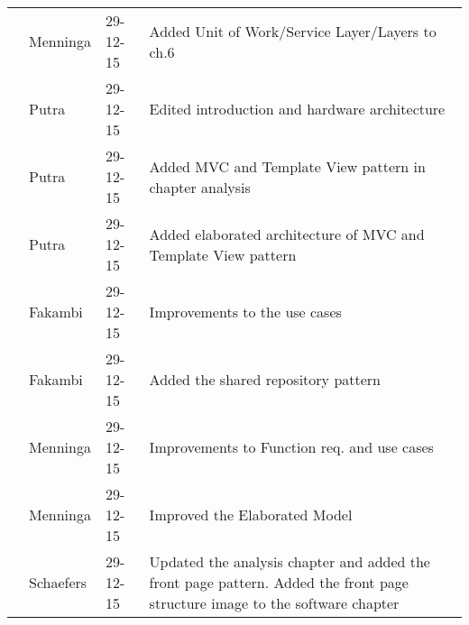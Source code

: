 \begin{longtable}{L{} L{} L{} L{}}
					& Menninga  & 29-12-15 & Added Unit of Work/Service Layer/Layers to ch.6 \\
					& Putra		& 29-12-15 & Edited introduction and hardware architecture \\
					& Putra		& 29-12-15 & Added MVC and Template View pattern in chapter analysis\\
					& Putra		& 29-12-15 & Added elaborated architecture of MVC and Template View pattern\\
					& Fakambi   & 29-12-15 & Improvements to the use cases \\
					& Fakambi   & 29-12-15 & Added the shared repository pattern \\
					& Menninga  & 29-12-15 & Improvements to Function req. and use cases\\
					& Menninga  & 29-12-15 & Improved the Elaborated Model \\
					& Schaefers & 29-12-15 & Updated the analysis chapter and added the front page pattern. Added the front page structure image to the software chapter \\
	\bottomrule
\end{longtable}